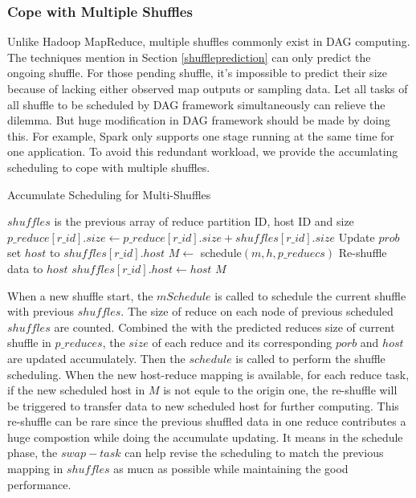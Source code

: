 \documentclass[10pt,twocolumn]{article}
\begin{document}
\subsubsection{Cope with Multiple Shuffles}
Unlike Hadoop MapReduce, multiple shuffles commonly exist in DAG computing. The techniques mention in Section \ref{shuffleprediction} can only predict the ongoing shuffle. For those pending shuffle, it's impossible to predict their size because of lacking either observed map outputs or sampling data. Let all tasks of all shuffle to be scheduled by DAG framework simultaneously can relieve the dilemma. But huge modification in DAG framework should be made by doing this. For example, Spark only supports one stage running at the same time for one application. To avoid this redundant workload, we provide the accumlating scheduling to cope with multiple shuffles.
\begin{minipage}{\linewidth}
\begin{algorithm}[H]
\caption{Accumulate Scheduling for Multi-Shuffles}
\label{mhminheap}
	\begin{algorithmic}[1]
	\small
		\State
		\Comment $shuffles$ is the previous array of reduce partition ID, host ID and size
		\State $p\_reduce\left[r\_id\right].size\gets p\_reduce\left[r\_id\right].size + shuffles\left[r\_id\right].size$
		\State Update $prob$ set $host$ to $shuffles\left[r\_id\right].host$
		\EndIf
		\EndFor
		\State $M\gets$ schedule$\left(m, h, p\_reduecs\right)$
				\State Re-shuffle data to $host$
				\State $shuffles\left[r\_id\right].host\gets host$
				\EndIf
			\EndFor
		\EndFor
		\Return $M$
	\EndProcedure
	\end{algorithmic}
\end{algorithm}
\end{minipage}

When a new shuffle start, the $mSchedule$ is called to schedule the current shuffle with previous $shuffles$. The size of reduce on each node of previous scheduled $shuffles$ are counted. Combined the with the predicted reduces size of current shuffle in $p\_reduces$, the $size$ of each reduce and its corresponding $porb$ and $host$ are updated accumulately. Then the $schedule$ is called to perform the shuffle scheduling. When the new host-reduce mapping is available, for each reduce task, if the new scheduled host in $M$ is not equle to the origin one, the re-shuffle will be triggered to transfer data to new scheduled host for further computing. This re-shuffle can be rare since the previous shuffled data in one reduce contributes a huge compostion while doing the accumulate updating. It means in the schedule phase, the $swap-task$ can help revise the scheduling to match the previous mapping in $shuffles$ as mucn as possible while maintaining the good performance.
\end{document}
